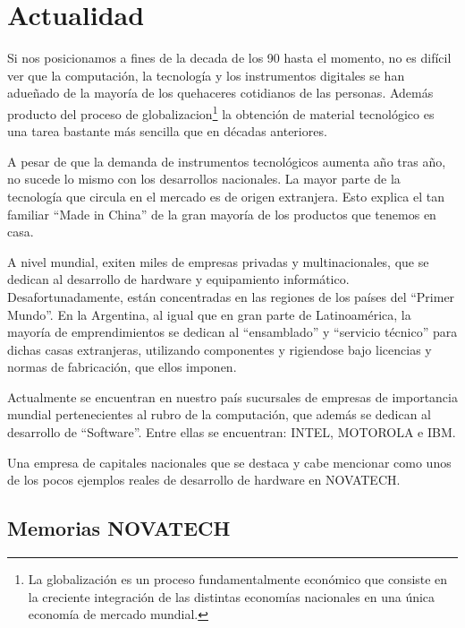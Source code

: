 \documentclass[%
 	final,
%
	notitlepage,
	narroweqnarray,
	inline,
 	twoside,
	]{ieee}
\begin{document}
\section{Actualidad }
Si nos posicionamos a fines de la decada de los 90 hasta el momento, no es dif\'icil ver que la computaci\'on, la tecnolog\'ia y los instrumentos digitales se han adue\~nado de la mayor\'ia de los quehaceres cotidianos de las personas. Adem\'as producto del proceso de globalizacion\footnote{La globalización es un proceso fundamentalmente econ\'omico que consiste en la creciente integraci\'on de las distintas econom\'ias nacionales en una \'unica econom\'ia de mercado mundial.} la obtenci\'on de material tecnol\'ogico es una tarea bastante m\'as sencilla que en d\'ecadas anteriores.

A pesar de que la demanda de instrumentos tecnol\'ogicos aumenta a\~no tras a\~no, no sucede lo mismo con los desarrollos nacionales. La mayor parte de la tecnolog\'ia que circula en el mercado es de origen extranjera. Esto explica el tan familiar ``Made in China'' de la gran mayor\'ia de los productos que tenemos en casa.

A nivel mundial, exiten miles de empresas privadas y multinacionales, que se dedican al desarrollo de hardware y equipamiento inform\'atico. Desafortunadamente, est\'an concentradas en las regiones de los pa\'ises del ``Primer Mundo''. En la Argentina, al igual que en gran parte de Latinoam\'erica, la mayor\'ia de emprendimientos se dedican al ``ensamblado'' y ``servicio t\'ecnico'' para dichas casas extranjeras, utilizando componentes y rigiendose bajo licencias y normas de fabricaci\'on, que ellos imponen.

Actualmente se encuentran en nuestro pa\'is sucursales de empresas de importancia mundial pertenecientes al rubro de la computaci\'on, que adem\'as se dedican al desarrollo de ``Software''. Entre ellas se encuentran: INTEL, MOTOROLA e IBM.

Una empresa de capitales nacionales que se destaca y cabe mencionar como unos de los pocos ejemplos reales de desarrollo de hardware en NOVATECH.

\subsection*{Memorias NOVATECH}
\end{document}
